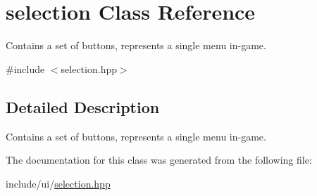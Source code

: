 \hypertarget{classselection}{\section{selection Class Reference}
\label{classselection}
}


Contains a set of buttons, represents a single menu in-\/game.  




{\ttfamily \#include $<$selection.\-hpp$>$}



\subsection{Detailed Description}
Contains a set of buttons, represents a single menu in-\/game. 

The documentation for this class was generated from the following file\-:\begin{DoxyCompactItemize}
\item 
include/ui/\hyperlink{selection_8hpp}{selection.\-hpp}\end{DoxyCompactItemize}
